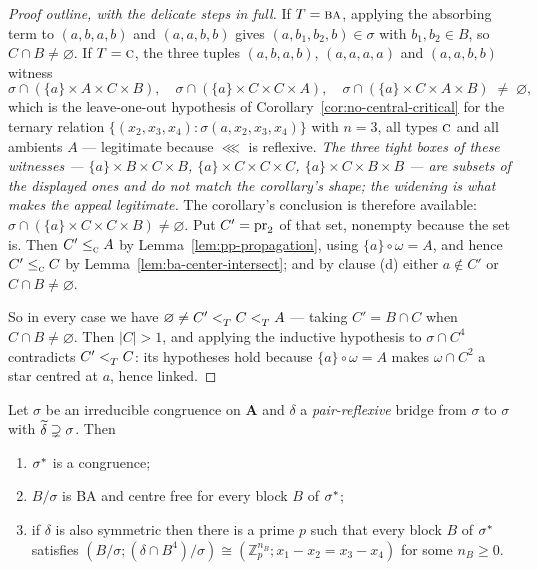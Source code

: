 \begin{proof}[Proof outline, with the delicate steps in full]
If $T=\textup{\textsc{ba}}$, applying the absorbing term to $(a,b,a,b)$ and $(a,a,b,b)$ gives
$(a,b_{1},b_{2},b)\in\sigma$ with $b_{1},b_{2}\in B$, so $C\cap B\neq
\varnothing$. If $T=\textup{\textsc{c}}$, the three tuples $(a,b,a,b)$, $(a,a,a,a)$ and
$(a,a,b,b)$ witness
\[
  \sigma\cap(\{a\}\times A\times C\times B),\quad
  \sigma\cap(\{a\}\times C\times C\times A),\quad
  \sigma\cap(\{a\}\times C\times A\times B)\;\neq\;\varnothing ,
\]
which is the leave-one-out hypothesis of
Corollary~\ref{cor:no-central-critical} for the ternary relation
$\{(x_{2},x_{3},x_{4}):\sigma(a,x_{2},x_{3},x_{4})\}$ with $n=3$, all types
$\textup{\textsc{c}}$ and all ambients $A$ --- legitimate because $\lll$ is reflexive.
\emph{The three tight boxes of these witnesses --- $\{a\}\times B\times C\times
B$, $\{a\}\times C\times C\times C$, $\{a\}\times C\times B\times B$ --- are
subsets of the displayed ones and do not match the corollary's shape; the
widening is what makes the appeal legitimate.} The corollary's conclusion is
therefore available:
$\sigma\cap(\{a\}\times C\times C\times B)\neq\varnothing$. Put
$C'=\operatorname*{pr}_{2}$ of that set, nonempty because the set is. Then
$C'\le_{\textup{\textsc{c}}}^{}A$ by Lemma~\ref{lem:pp-propagation}, using
$\{a\}\circ\omega=A$, and hence
$C'\le_{\textup{\textsc{c}}}^{}C$ by Lemma~\ref{lem:ba-center-intersect}; and by clause (d)
either $a\notin C'$ or $C\cap B\neq\varnothing$.

So in every case we have $\varnothing\neq C'<_{T}^{}C<_{T}^{}A$ --- taking
$C'=B\cap C$ when $C\cap B\neq\varnothing$. Then $|C|>1$, and applying the
inductive hypothesis to $\sigma\cap C^{4}$ contradicts $C'<_{T}^{}C$: its
hypotheses hold because $\{a\}\circ\omega=A$ makes $\omega\cap C^{2}$ a star
centred at $a$, hence linked.
\end{proof}

\begin{longlemma}\label{lem:nontrivial-bridge}
Let $\sigma$ be an irreducible congruence on $\mathbf A$ and $\delta$ a
\emph{pair-reflexive} bridge from $\sigma$ to $\sigma$ with
$\widetilde{\delta}\supsetneq\sigma$. Then
\begin{enumerate}\alphlabels\tightlist
\item $\sigma^{*}$ is a congruence;
\item $B/\sigma$ is BA and centre free for every block $B$ of $\sigma^{*}$;
\item if $\delta$ is also symmetric then there is a prime $p$ such that every
  block $B$ of $\sigma^{*}$ satisfies
  $(B/\sigma;(\delta\cap B^{4})/\sigma)\cong(\mathbb Z_{p}^{n_{B}};
   x_{1}-x_{2}=x_{3}-x_{4})$ for some $n_{B}\ge 0$.
\end{enumerate}
\end{longlemma}

